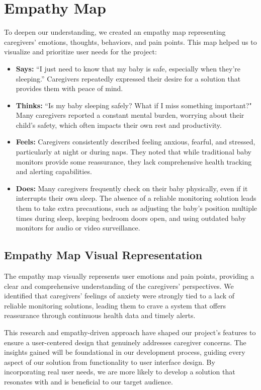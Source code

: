 \documentclass[12pt,a4paper]{report}
\begin{document}
\section{Empathy Map}
To deepen our understanding, we created an empathy map representing caregivers' emotions, thoughts, behaviors, and pain points. This map helped us to visualize and prioritize user needs for the project:
\begin{itemize}
  \item \textbf{Says:} ``I just need to know that my baby is safe, especially when they’re sleeping.” Caregivers repeatedly expressed their desire for a solution that provides them with peace of mind.

  \item \textbf{Thinks:} ``Is my baby sleeping safely? What if I miss something important?" Many caregivers reported a constant mental burden, worrying about their child’s safety, which often impacts their own rest and productivity.

  \item \textbf{Feels:} Caregivers consistently described feeling anxious, fearful, and stressed, particularly at night or during naps. They noted that while traditional baby monitors provide some reassurance, they lack comprehensive health tracking and alerting capabilities.

  \item \textbf{Does:} Many caregivers frequently check on their baby physically, even if it interrupts their own sleep. The absence of a reliable monitoring solution leads them to take extra precautions, such as adjusting the baby's position multiple times during sleep, keeping bedroom doors open, and using outdated baby monitors for audio or video surveillance.
\end{itemize}
\subsection{Empathy Map Visual Representation}
The empathy map visually represents user emotions and pain points, providing a clear and comprehensive understanding of the caregivers’ perspectives. We identified that caregivers' feelings of anxiety were strongly tied to a lack of reliable monitoring solutions, leading them to crave a system that offers reassurance through continuous health data and timely alerts.

This research and empathy-driven approach have shaped our project’s features to ensure a user-centered design that genuinely addresses caregiver concerns. The insights gained will be foundational in our development process, guiding every aspect of our solution from functionality to user interface design. By incorporating real user needs, we are more likely to develop a solution that resonates with and is beneficial to our target audience.
\end{document}
